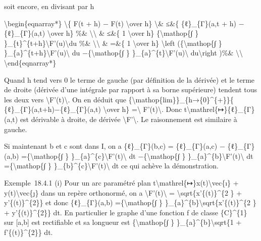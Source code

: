 \documentclass[]{article}
\begin{document}
soit encore, en divisant par h

\textbackslash{}begin\{eqnarray*\} \textbackslash{}\textbar{}\{ F(t + h)
− F(t) \textbackslash{}over h\} \textbackslash{}\textbar{}\& ≤\&\{
\{ℓ\}\_\{Γ\}(a,t + h) − \{ℓ\}\_\{Γ\}(a,t) \textbackslash{}over h\} \%\&
\textbackslash{}\textbackslash{} \& ≤\&\{ 1 \textbackslash{}over h\}
\{\textbackslash{}mathop\{∫ \}
\}\_\{t\}\^{}\{t+h\}\textbackslash{}\textbar{}F'(u)\textbackslash{}\textbar{}du
\%\& \textbackslash{}\textbackslash{} \& =\&\{ 1 \textbackslash{}over
h\} \textbackslash{}left (\{\textbackslash{}mathop\{∫ \}
\}\_\{a\}\^{}\{t+h\}\textbackslash{}\textbar{}F'(u)\textbackslash{}\textbar{}
du −\{\textbackslash{}mathop\{∫ \}
\}\_\{a\}\^{}\{t\}\textbackslash{}\textbar{}F'(u)\textbackslash{}\textbar{}
du\textbackslash{}right )\%\& \textbackslash{}\textbackslash{}
\textbackslash{}end\{eqnarray*\}

Quand h tend vers 0 le terme de gauche (par définition de la dérivée) et
le terme de droite (dérivée d'une intégrale par rapport à sa borne
supérieure) tendent tous les deux vers
\textbackslash{}\textbar{}F'(t)\textbackslash{}\textbar{}. On en déduit
que \{\textbackslash{}mathop\{lim\}\}\_\{h→\{0\}\^{}\{+\}\}\{
\{ℓ\}\_\{Γ\}(a,t+h)−\{ℓ\}\_\{Γ\}(a,t) \textbackslash{}over h\}
=\textbackslash{}\textbar{} F'(t)\textbackslash{}\textbar{}. Donc
t\textbackslash{}mathrel\{↦\}\{ℓ\}\_\{Γ\}(a,t) est dérivable à droite,
de dérivée \textbackslash{}\textbar{}F'\textbackslash{}\textbar{}. Le
raisonnement est similaire à gauche.

Si maintenant b et c sont dans I, on a \{ℓ\}\_\{Γ\}(b,c) =
\{ℓ\}\_\{Γ\}(a,c) − \{ℓ\}\_\{Γ\}(a,b) =\{\textbackslash{}mathop\{∫ \}
\}\_\{a\}\^{}\{c\}\textbackslash{}\textbar{}F'(t)\textbackslash{}\textbar{}
dt −\{\textbackslash{}mathop\{∫ \}
\}\_\{a\}\^{}\{b\}\textbackslash{}\textbar{}F'(t)\textbackslash{}\textbar{}
dt =\{\textbackslash{}mathop\{∫ \}
\}\_\{b\}\^{}\{c\}\textbackslash{}\textbar{}F'(t)\textbackslash{}\textbar{}
dt ce qui achève la démonstration.

Exemple~18.4.1 (i) Pour un arc paramétré plan
t\textbackslash{}mathrel\{↦\}x(t)\textbackslash{}vec\{ı\} +
y(t)\textbackslash{}vec\{ȷ\} dans un repère orthonormé, on a
\textbackslash{}\textbar{}F'(t)\textbackslash{}\textbar{} =
\textbackslash{}sqrt\{x'\{(t)\}\^{}\{2 \} + y'\{(t)\}\^{}\{2\}\} et donc
\{ℓ\}\_\{Γ\}(a,b) =\{\textbackslash{}mathop\{∫ \}
\}\_\{a\}\^{}\{b\}\textbackslash{}sqrt\{x'\{(t)\}\^{}\{2 \} +
y'\{(t)\}\^{}\{2\}\} dt. En particulier le graphe d'une fonction f de
classe \{C\}\^{}\{1\} sur {[}a,b{]} est rectifiable et sa longueur est
\{\textbackslash{}mathop\{∫ \} \}\_\{a\}\^{}\{b\}\textbackslash{}sqrt\{1
+ f'\{(t)\}\^{}\{2\}\} dt.
\end{document}
